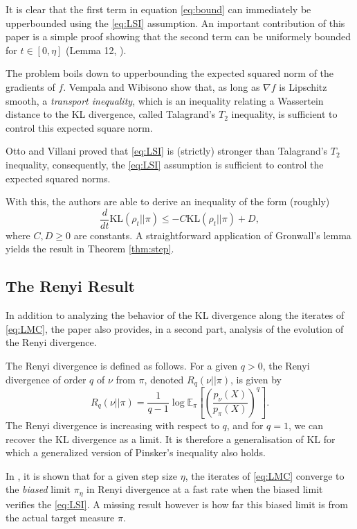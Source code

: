 \documentclass[10pt,journal,a4paper]{IEEEtran}
\theoremstyle{definition}
\newcommand{\E}{\mathbb{E}}
\newcommand{\KL}{\text{KL}}
\begin{document}
It is clear that the {\color{Fuchsia} first} term in equation \eqref{eq:bound} can immediately be upperbounded using the \eqref{eq:LSI} assumption. An important contribution of this paper is a simple proof showing that the {\color{Bittersweet} second} term can be uniformely bounded for $t \in [0, \eta]$ (Lemma 12, \cite{vempala_rapid_2019}).

The problem boils down to upperbounding the expected squared norm of the gradients of $f$. Vempala and Wibisono show that, as long as $\nabla f$ is Lipschitz smooth, a \textit{transport inequality}, which is an inequality relating a Wassertein distance to the KL divergence, called Talagrand's $T_2$ inequality, is sufficient to control this expected square norm. 

Otto and Villani proved that \eqref{eq:LSI} is (strictly) stronger than Talagrand's $T_2$ inequality, consequently, the \eqref{eq:LSI} assumption is sufficient to control the expected squared norms.

With this, the authors are able to derive an inequality of the form (roughly)
\[
\frac{d}{dt}\KL(\rho_t || \pi) \leq -C\KL(\rho_t || \pi) + D,
\]
where $C, D \geq 0$ are constants. A straightforward application of Gronwall's lemma yields the result in Theorem \ref{thm:step}.

\subsection{The Renyi Result}

In addition to analyzing the behavior of the $\KL$ divergence along the iterates of \eqref{eq:LMC}, the paper also provides, in a second part, analysis of the evolution of the Renyi divergence.

The Renyi divergence is defined as follows. For a given $q > 0$, the Renyi divergence of order $q$ of $\nu$ from $\pi$, denoted $R_q(\nu || \pi)$, is given by
\[
R_q(\nu || \pi) = \frac{1}{q-1}\log\E_\pi\left[\left( \frac{p_{\nu}(X)}{p_\pi(X)}\right)^q\right].
\]
The Renyi divergence is increasing with respect to $q$, and for $q=1$, we can recover the $\KL$ divergence as a limit. It is therefore a generalisation of $\KL$ for which a generalized version of Pinsker's inequality also holds.

In \cite{vempala_rapid_2019}, it is shown that for a given step size $\eta$, the iterates of \eqref{eq:LMC} converge to the \textit{biased} limit $\pi_\eta$ in Renyi divergence at a fast rate when the biased limit verifies the \eqref{eq:LSI}. A missing result however is how far this biased limit is from the actual target measure $\pi$.
\end{document}
